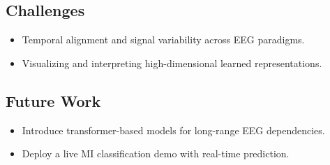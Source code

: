 \subsection*{Challenges}
\begin{itemize}[leftmargin=3.5em]
    \item Temporal alignment and signal variability across EEG paradigms.
    \item Visualizing and interpreting high-dimensional learned representations.
\end{itemize}

\subsection*{Future Work}
\begin{itemize}[leftmargin=3.5em]
    \item Introduce transformer-based models for long-range EEG dependencies.
    \item Deploy a live MI classification demo with real-time prediction.
\end{itemize}
